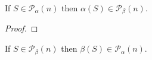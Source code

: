 \begin{lemma} \leanok
 If $S\in \mathcal{P}_\alpha(n)$ then $\alpha (S)\in \mathcal{P}_\beta(n)$.
\end{lemma}
\begin{proof}\leanok
\end{proof}

\begin{lemma} \leanok
 If $S\in \mathcal{P}_\beta(n)$ then $\beta (S)\in \mathcal{P}_\alpha(n)$.
\end{lemma}

